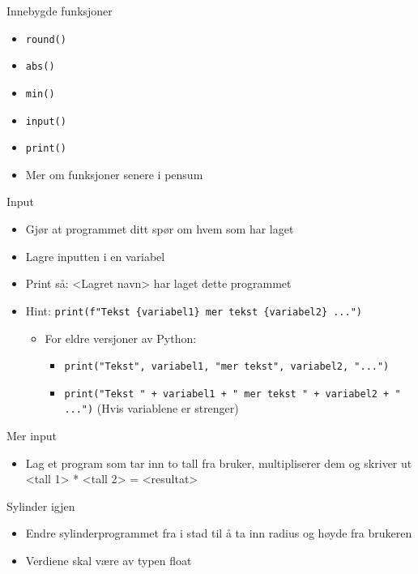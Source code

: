 \documentclass[screen, aspectratio=169]{beamer}
\begin{document}
\begin{frame}[fragile]{Innebygde funksjoner}
	\begin{itemize}
		\item \lstinline|round()|
		\item \lstinline|abs()|
		\item \lstinline|min()|
		\item \lstinline|input()|
		\item \lstinline|print()|
		\vspace{1em}
		\item Mer om funksjoner senere i pensum
	\end{itemize}
\end{frame}

\begin{frame}[fragile]{Input}
	\begin{itemize}
		\item Gjør at programmet ditt spør om hvem som har laget
		\item Lagre inputten i en variabel
		\item Print så: <Lagret navn> har laget dette programmet
		\vspace{1em}
		\item Hint: \lstinline|print(f"Tekst {variabel1} mer tekst {variabel2} ...")|
		\begin{itemize}
			\item For eldre versjoner av Python:
			\begin{itemize}
				\item  \lstinline|print("Tekst", variabel1, "mer tekst", variabel2, "...")|
				\item \lstinline|print("Tekst " + variabel1 + " mer tekst " + variabel2 + " ...")| (Hvis variablene er strenger)
			\end{itemize}
		\end{itemize}
	\end{itemize}
\end{frame}

\begin{frame}{Mer input}
	\begin{itemize}
		\item Lag et program som tar inn to tall fra bruker, multipliserer dem og skriver ut <tall 1> * <tall 2> = <resultat>
	\end{itemize}
\end{frame}

\begin{frame}{Sylinder igjen}
	\begin{itemize}
		\item Endre sylinderprogrammet fra i stad til å ta inn radius og høyde fra brukeren
		\item Verdiene skal være av typen float
	\end{itemize}
\end{frame}
\end{document}

